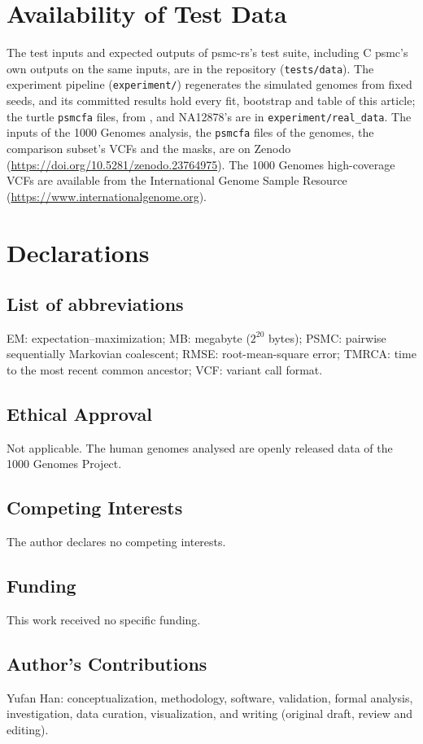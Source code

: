 \documentclass[a4paper,num-refs,gigabyte]{oup-contemporary}%
\newcommand{\psmcrs}{psmc-rs}
\begin{document}
\section{Availability of Test Data}
The test inputs and expected outputs of \psmcrs{}'s test suite, including C psmc's own outputs on the same inputs, are in the repository (\texttt{tests/data}). The experiment pipeline (\texttt{experiment/}) regenerates the simulated genomes from fixed seeds, and its committed results hold every fit, bootstrap and table of this article; the turtle \texttt{psmcfa} files, from \citet{hilgers2025}, and NA12878's are in \texttt{experiment/real\_data}. The inputs of the 1000 Genomes analysis, the \texttt{psmcfa} files of the \EsevenGenomes{} genomes, the comparison subset's VCFs and the masks, are on Zenodo (\url{https://doi.org/10.5281/zenodo.23764975}). The 1000 Genomes high-coverage VCFs are available from the International Genome Sample Resource (\url{https://www.internationalgenome.org}).

\section{Declarations}

\subsection{List of abbreviations}
EM: expectation--maximization; MB: megabyte ($2^{20}$ bytes); PSMC: pairwise sequentially Markovian coalescent; RMSE: root-mean-square error; TMRCA: time to the most recent common ancestor; VCF: variant call format.

\subsection{Ethical Approval}
Not applicable. The human genomes analysed are openly released data of the 1000 Genomes Project.

\subsection{Competing Interests}
The author declares no competing interests.

\subsection{Funding}
This work received no specific funding.

\subsection{Author's Contributions}
Yufan Han: conceptualization, methodology, software, validation, formal analysis, investigation, data curation, visualization, and writing (original draft, review and editing).
\end{document}
